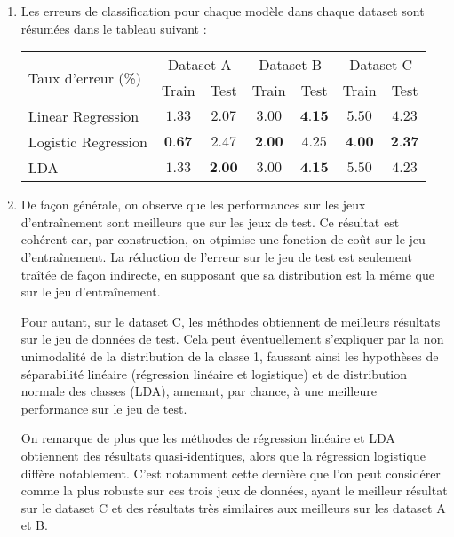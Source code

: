 \documentclass{article}
\begin{document}
\begin{enumerate}[label=(\alph*)]
\item Les erreurs de classification pour chaque modèle dans chaque dataset sont résumées dans le tableau suivant :
\begin{center}
\begin{tabular}{|l|c|c|c|c|c|c|}
\hline
\multirow{2}{*}{Taux d'erreur (\%)} & \multicolumn{2}{c|}{Dataset A} & \multicolumn{2}{c|}{Dataset B} & \multicolumn{2}{c|}{Dataset C}\\
& Train & Test & Train & Test & Train & Test\\
\hline
Linear Regression & $1.33$ & $2.07$ & $3.00$ & $\textbf{4.15}$ & $5.50$ & $4.23$\\
\hline
Logistic Regression & $\textbf{0.67}$ & $2.47$ & $\textbf{2.00}$ & $4.25$ & $\textbf{4.00}$ & $\textbf{2.37}$\\
\hline
LDA & $1.33$ & $\textbf{2.00}$ & $3.00$ & $\textbf{4.15}$ & $5.50$ & $4.23$\\
\hline
\end{tabular}
\end{center}

\item De façon générale, on observe que les performances sur les jeux d'entraînement sont meilleurs que sur les jeux de test. Ce résultat est cohérent car, par construction, on otpimise une fonction de coût sur le jeu d'entraînement. La réduction de l'erreur sur le jeu de test est seulement traîtée de façon indirecte, en supposant que sa distribution est la même que sur le jeu d'entraînement.

Pour autant, sur le dataset C, les méthodes obtiennent de meilleurs résultats sur le jeu de données de test. Cela peut éventuellement s'expliquer par la non unimodalité de la distribution de la classe 1, faussant ainsi les hypothèses de séparabilité linéaire (régression linéaire et logistique) et de distribution normale des classes (LDA), amenant, par chance, à une meilleure performance sur le jeu de test.

On remarque de plus que les méthodes de régression linéaire et LDA obtiennent des résultats quasi-identiques, alors que la régression logistique diffère notablement. C'est notamment cette dernière que l'on peut considérer comme la plus robuste sur ces trois jeux de données, ayant le meilleur résultat sur le dataset C et des résultats très similaires aux meilleurs sur les dataset A et B.


\end{enumerate}
\end{document}
